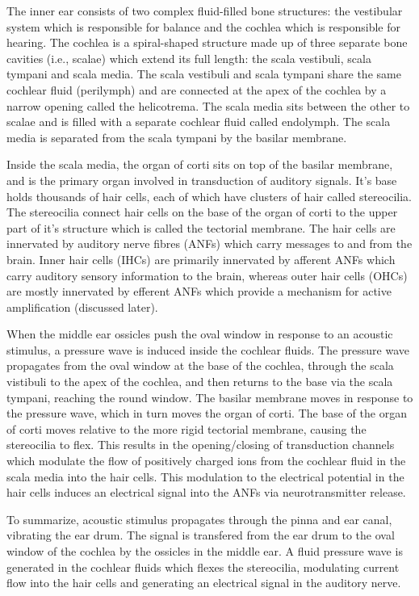 The inner ear consists of two complex fluid-filled bone structures: the vestibular system which is responsible for balance and the cochlea which is responsible for hearing. The cochlea is a spiral-shaped structure made up of three separate bone cavities (i.e., scalae) which extend its full length: the scala vestibuli, scala tympani and scala media. The scala vestibuli and scala tympani share the same cochlear fluid (perilymph) and are connected at the apex of the cochlea by a narrow opening called the helicotrema. The scala media sits between the other to scalae and is filled with a separate cochlear fluid called endolymph. The scala media is separated from the scala tympani by the basilar membrane. 

Inside the scala media, the organ of corti sits on top of the basilar membrane, and is the primary organ involved in transduction of auditory signals. It's base holds thousands of hair cells, each of which have clusters of hair called stereocilia. The stereocilia connect hair cells on the base of the organ of corti to the upper part of it's structure which is called the tectorial membrane. The hair cells are innervated by auditory nerve fibres (ANFs) which carry messages to and from the brain. Inner hair cells (IHCs) are primarily innervated by afferent ANFs which carry auditory sensory information to the brain, whereas outer hair cells (OHCs) are mostly innervated by efferent ANFs which provide a mechanism for active amplification (discussed later).

When the middle ear ossicles push the oval window in response to an acoustic stimulus, a pressure wave is induced inside the cochlear fluids. The pressure wave propagates from the oval window at the base of the cochlea, through the scala vistibuli to the apex of the cochlea, and then returns to the base via the scala tympani, reaching the round window. The basilar membrane moves in response to the pressure wave, which in turn moves the organ of corti. The base of the organ of corti moves relative to the more rigid tectorial membrane, causing the stereocilia to flex. This results in the opening/closing of transduction channels which modulate the flow of positively charged ions from the cochlear fluid in the scala media into the hair cells. This modulation to the electrical potential in the hair cells induces an electrical signal into the ANFs via neurotransmitter release.

To summarize, acoustic stimulus propagates through the pinna and ear canal, vibrating the ear drum. The signal is transfered from the ear drum to the oval window of the cochlea by the ossicles in the middle ear. A fluid pressure wave is generated in the cochlear fluids which flexes the stereocilia, modulating current flow into the hair cells and generating an electrical signal in the auditory nerve. 

